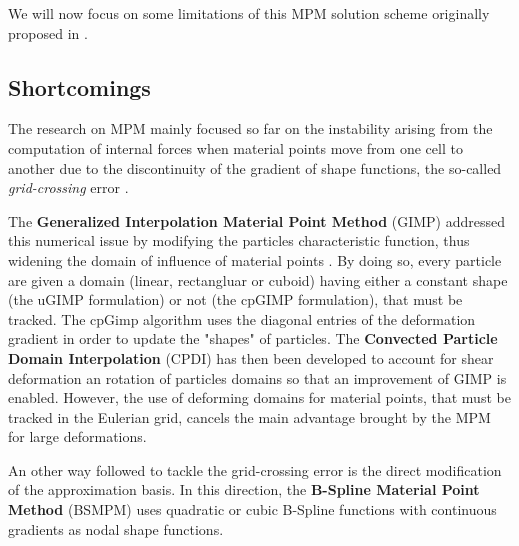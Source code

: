 We will now focus on some limitations of this MPM solution scheme originally proposed in \cite{Sulsky94}.
\subsection{Shortcomings}

The research on MPM mainly focused so far on the instability arising from the computation of internal forces when material points move from one cell to another due to the discontinuity of the gradient of shape functions, the so-called \textit{grid-crossing} error \cite{Gimp}.

The \textbf{Generalized Interpolation Material Point Method} (GIMP) addressed this numerical issue by modifying the particles characteristic function, thus widening the domain of influence of material points \cite{Gimp}. By doing so, every particle are given a domain (linear, rectangluar or cuboid) having either a constant shape (the uGIMP formulation) or not (the cpGIMP formulation), that must be tracked. The cpGimp algorithm uses the diagonal entries of the deformation gradient in order to update the "shapes" of particles. The \textbf{Convected Particle Domain Interpolation} (CPDI) \cite{CPDI} has then been developed to account for shear deformation an rotation of particles domains so that an improvement of GIMP is enabled. However, the use of deforming domains for material points, that must be tracked in the Eulerian grid, cancels the main advantage brought by the MPM for large deformations. 

An other way followed to tackle the grid-crossing error is the direct modification of the approximation basis. In this direction, the \textbf{B-Spline Material Point Method} (BSMPM) \cite{Steffen_quadError} uses quadratic or cubic B-Spline functions with continuous gradients as nodal shape functions.

